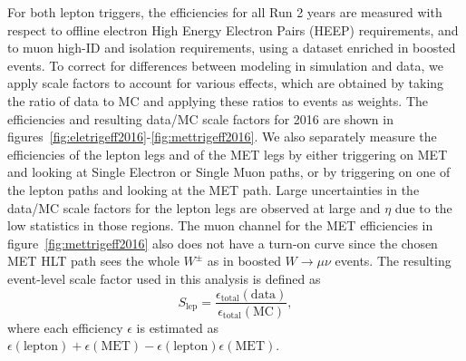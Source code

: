 For both lepton triggers, the efficiencies for all Run 2 years are measured with respect to offline electron High Energy Electron Pairs (HEEP) requirements, and to muon high-\pt ID and isolation requirements, using a dataset enriched in boosted \Wjets events.
To correct for differences between modeling in simulation and data, we apply scale factors to account for various effects, which are obtained by taking the ratio of data to MC and applying these ratios to events as weights.
The efficiencies and resulting data/MC scale factors for 2016 are shown in figures~\ref{fig:eletrigeff2016}-\ref{fig:mettrigeff2016}.
We also separately measure the efficiencies of the lepton legs and of the MET legs by either triggering on MET and looking at Single Electron or Single Muon paths, or by triggering on one of the lepton paths and looking at the MET path.
Large uncertainties in the data/MC scale factors for the lepton legs are observed at large \pt and $\eta$ due to the low statistics in those regions.
The muon channel for the MET efficiencies in figure~\ref{fig:mettrigeff2016} also does not have a turn-on curve since the chosen MET HLT path sees the whole $W^\pm$ as \ptmiss in boosted $W\to\mu\nu$ events.
The resulting event-level scale factor used in this analysis is defined as
\begin{equation}
  S_\mathrm{lep}=\frac{\epsilon_\mathrm{total}(\mathrm{data})}{\epsilon_\mathrm{total}(\mathrm{MC})},
\end{equation}
where each efficiency $\epsilon$ is estimated as $\epsilon(\mathrm{lepton})+\epsilon(\mathrm{MET})-\epsilon(\mathrm{lepton})\epsilon(\mathrm{MET})$.

